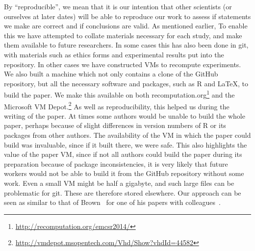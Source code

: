 By ``reproducible'', we mean that it is our intention that other scientists (or
ourselves at later dates) will be able to reproduce our work to assess if
statements we make are correct and if conclusions are valid.  
As mentioned earlier, 
To enable this we
have attempted to collate materials necessary for each study, and make them
available to future researchers.  
In some cases this has also been done in git,
with materials such as ethics forms and experimental results put into the repository.  
In other cases we have constructed VMs to recompute experiments.  
We also built a machine which not only contains a clone of the GitHub
repository, but all the necessary software and packages, such as R and
\LaTeX, to build the paper. We make this available on both
recomputation.org\footnote{\url{http://recomputation.org/emcsr2014/}}
and the Microsoft VM
Depot.\footnote{\url{http://vmdepot.msopentech.com/Vhd/Show?vhdId=44582}}
As well as reproducibility, this helped us during the writing of the paper.  At times some authors would be unable to build the whole paper, perhaps because of slight differences in version numbers of R or its packages from other authors.  The availability of the VM in which the paper could build was invaluable, since if it built there, we were safe.  This also highlights the value of the paper VM, since if not all authors could build the paper during its preparation because of package inconsistencies, it is very likely that future workers would not be able to build it from the GitHub repository without some work.
Even a small VM 
might be half a gigabyte, and such large files can be problematic for git.
These are therefore stored elsewhere.  
Our approach can be seen as similar to that of Brown~\cite{brown} for one of his papers with colleagues~\cite{Brown2012}.



